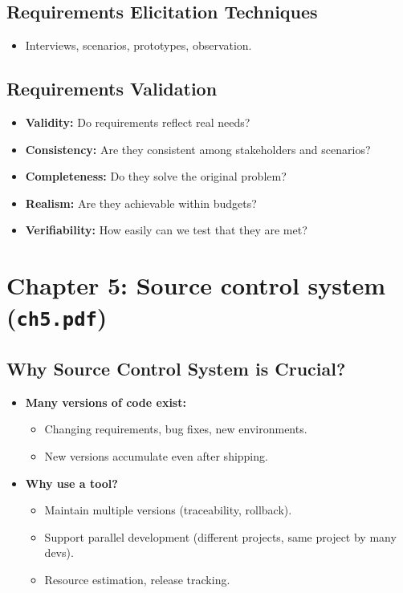 \documentclass[11pt,a4paper]{article}
\begin{document}
\subsection*{Requirements Elicitation Techniques}
\begin{itemize}
    \item Interviews, scenarios, prototypes, observation.
\end{itemize}

\subsection*{Requirements Validation}
\begin{itemize}
    \item \textbf{Validity:} Do requirements reflect real needs?
    \item \textbf{Consistency:} Are they consistent among stakeholders and scenarios?
    \item \textbf{Completeness:} Do they solve the original problem?
    \item \textbf{Realism:} Are they achievable within budgets?
    \item \textbf{Verifiability:} How easily can we test that they are met?
\end{itemize}

\section{Chapter 5: Source control system (\texttt{ch5.pdf})}

\subsection*{Why Source Control System is Crucial?}
\begin{itemize}
    \item \textbf{Many versions of code exist:}
        \begin{itemize}
            \item Changing requirements, bug fixes, new environments.
            \item New versions accumulate even after shipping.
        \end{itemize}
    \item \textbf{Why use a tool?}
        \begin{itemize}
            \item Maintain multiple versions (traceability, rollback).
            \item Support parallel development (different projects, same project by many devs).
            \item Resource estimation, release tracking.
        \end{itemize}
\end{itemize}
\end{document}
